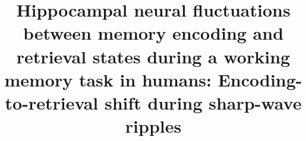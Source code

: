 \title{
Hippocampal neural fluctuations between memory encoding and retrieval states during a working memory task in humans: Encoding-to-retrieval shift during sharp-wave ripples
}